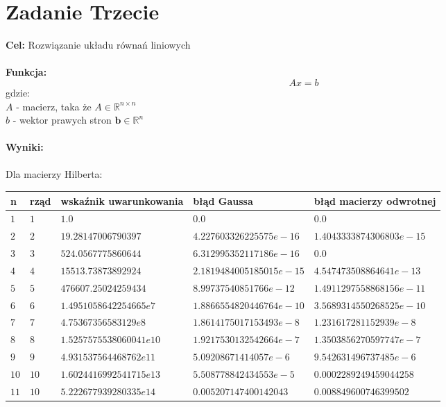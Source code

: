 \documentclass{article}
\begin{document}
\section*{Zadanie Trzecie}
\noindent \textbf{Cel: } Rozwiązanie układu równań liniowych\\\\
\noindent \textbf{Funkcja: }
$$ Ax =b $$ 
gdzie:\\
$A$ - macierz, taka że $A \in \mathbb{R}^{n \times n}$\\
$b$ - wektor prawych stron $\textbf{b} \in \mathbb{R}^{n}$ \\\\
\newpage
\noindent \textbf{Wyniki:} \\\\
Dla macierzy Hilberta:
\begin{center}
	\begin{tabular}{|p{1cm}|p{1cm}|p{4cm}|p{4cm}|p{4cm}|} \hline
		\textbf{n} & \textbf{rząd} & \textbf{wskaźnik \newline uwarunkowania} & \textbf{błąd Gaussa} & \textbf{błąd macierzy \newline odwrotnej}  \\
		\hline
		$1$ & $1$ & $1.0$ & $0.0$ & $0.0$  \\
		\hline
		$2$ & $2$ & $19.28147006790397$ & $4.227603326225575e-16$ & $1.4043333874306803e-15$  \\
		\hline
		$3$ & $3$ & $524.0567775860644$ & $6.312995352117186e-16$ & $0.0$  \\
		\hline
		$4$ & $4$ & $15513.73873892924$ & $2.1819484005185015e-15$ & $4.547473508864641e-13$  \\
		\hline
		$5$ & $5$ & $476607.25024259434$ & $8.99737540851766e-12$ & $1.4911297558868156e-11$  \\
		\hline
		$6$ & $6$ & $1.4951058642254665e7$ & $1.8866554820446764e-10$ & $3.5689314550268525e-10$  \\
		\hline
		$7$ & $7$ & $4.75367356583129e8$ & $1.8614175017153493e-8$ & $1.231617281152939e-8$  \\
		\hline
		$8$ & $8$ & $1.5257575538060041e10$ & $1.9217530132542664e-7$ & $1.3503856270597747e-7$  \\
		\hline
		$9$ & $9$ & $4.931537564468762e11$ & $5.09208671414057e-6$ & $9.542631496737485e-6$  \\
		\hline
		$10$ & $10$ & $1.6024416992541715e13$ & $5.508778842434553e-5$ & $0.0002289249459044258$  \\
		\hline
		$11$ & $10$ & $5.222677939280335e14$ & $0.005207147400142043$ & $0.008849600746399502$  \\

\end{tabular}
\end{center}
\end{document}
